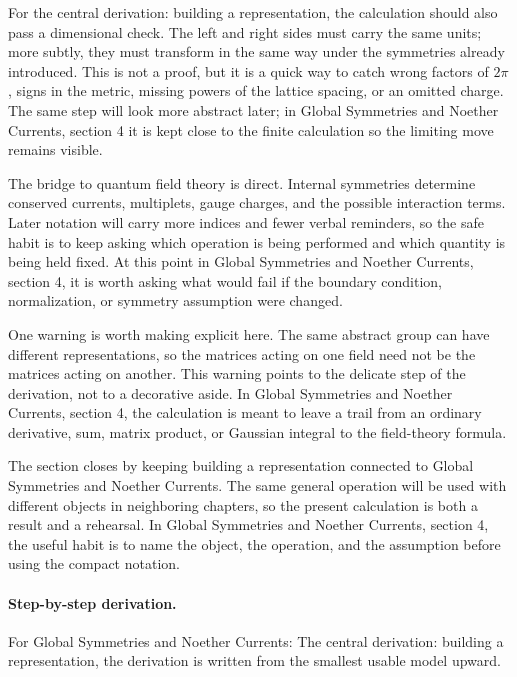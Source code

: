 For the central derivation: building a representation, the calculation should also pass a dimensional check.  The left and right sides must carry the same units; more subtly, they must transform in the same way under the symmetries already introduced.  This is not a proof, but it is a quick way to catch wrong factors of \(2\pi\), signs in the metric, missing powers of the lattice spacing, or an omitted charge.  The same step will look more abstract later; in Global Symmetries and Noether Currents, section 4 it is kept close to the finite calculation so the limiting move remains visible.

The bridge to quantum field theory is direct.  Internal symmetries determine conserved currents, multiplets, gauge charges, and the possible interaction terms.  Later notation will carry more indices and fewer verbal reminders, so the safe habit is to keep asking which operation is being performed and which quantity is being held fixed.  At this point in Global Symmetries and Noether Currents, section 4, it is worth asking what would fail if the boundary condition, normalization, or symmetry assumption were changed.

One warning is worth making explicit here.  The same abstract group can have different representations, so the matrices acting on one field need not be the matrices acting on another.  This warning points to the delicate step of the derivation, not to a decorative aside.  In Global Symmetries and Noether Currents, section 4, the calculation is meant to leave a trail from an ordinary derivative, sum, matrix product, or Gaussian integral to the field-theory formula.

The section closes by keeping building a representation connected to Global Symmetries and Noether Currents.  The same general operation will be used with different objects in neighboring chapters, so the present calculation is both a result and a rehearsal.  In Global Symmetries and Noether Currents, section 4, the useful habit is to name the object, the operation, and the assumption before using the compact notation.



\paragraph{Step-by-step derivation.}

For Global Symmetries and Noether Currents: The central derivation: building a representation, the derivation is written from the smallest usable model upward.

